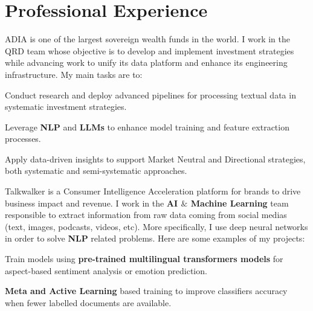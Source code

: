 \documentclass[]{deedy-resume-openfont}
\begin{document}
\lastupdated




\vspace{\topsep}

\section{Professional Experience}
\sectionsep

ADIA is one of the largest sovereign wealth funds in the world. I work in the QRD team whose objective is to develop and implement investment strategies while advancing work to unify its data platform and enhance its engineering infrastructure. My main tasks are to: $ $
\vspace{0.1cm}
\begin{tightemize}
	\item[\diamond] Conduct research and deploy advanced pipelines for processing textual data in systematic investment strategies.  
	\item[\diamond] Leverage \textbf{NLP} and \textbf{LLMs} to enhance model training and feature extraction processes.  
	\item[\diamond] Apply data-driven insights to support Market Neutral and Directional strategies, both systematic and semi-systematic approaches.
\end{tightemize}

\sectionsep

Talkwalker is a Consumer Intelligence Acceleration platform for brands to drive business impact and revenue. I work in the \textbf{AI $\&$ Machine Learning} team responsible to extract information from raw data coming from social medias (text, images, podcasts, videos, etc). More specifically, I use deep neural networks in order to solve \textbf{NLP} related problems. Here are some examples of my projects: $ $
\vspace{0.1cm}
\begin{tightemize}
	\item[\diamond] Train models using \textbf{pre-trained multilingual transformers models} for aspect-based sentiment analysis or emotion prediction.
	\item[\diamond] \textbf{Meta and Active Learning} based training to improve classifiers accuracy when fewer labelled documents are available.
\end{tightemize}
\end{document}
